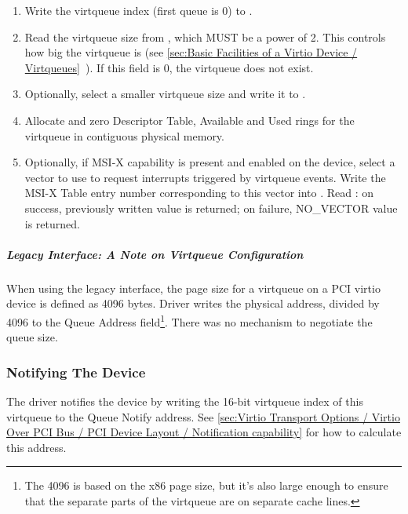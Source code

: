 \begin{enumerate}
\item Write the virtqueue index (first queue is 0) to .

\item Read the virtqueue size from , which MUST
   be a power of 2. This controls how big the virtqueue is
  (see \ref{sec:Basic Facilities of a Virtio Device / Virtqueues}~). If this field is 0, the virtqueue does not exist.

\item Optionally, select a smaller virtqueue size and write it to .

\item Allocate and zero Descriptor Table, Available and Used rings for the
   virtqueue in contiguous physical memory.

\item Optionally, if MSI-X capability is present and enabled on the
  device, select a vector to use to request interrupts triggered
  by virtqueue events. Write the MSI-X Table entry number
  corresponding to this vector into . Read
  : on success, previously written value is
  returned; on failure, NO_VECTOR value is returned.
\end{enumerate}

\subparagraph{Legacy Interface: A Note on Virtqueue Configuration}\label{sec:Virtio Transport Options / Virtio Over PCI Bus / PCI-specific Initialization And Device Operation / Device Initialization / Virtqueue Configuration / Legacy Interface: A Note on Virtqueue Configuration}
When using the legacy interface, the page size for a virtqueue on a PCI virtio
device is defined as 4096 bytes.  Driver writes the physical address, divided
by 4096 to the Queue Address field\footnote{The 4096 is based on the x86 page size, but it's also large
enough to ensure that the separate parts of the virtqueue are on
separate cache lines.
}.  There was no mechanism to negotiate the queue size.

\subsubsection{Notifying The Device}\label{sec:Virtio Transport Options / Virtio Over PCI Bus / PCI-specific Initialization And Device Operation / Notifying The Device}

The driver notifies the device by writing the 16-bit virtqueue index
of this virtqueue to the Queue Notify address.  See \ref{sec:Virtio Transport Options / Virtio Over PCI Bus / PCI Device Layout / Notification capability} for how to calculate this address.

